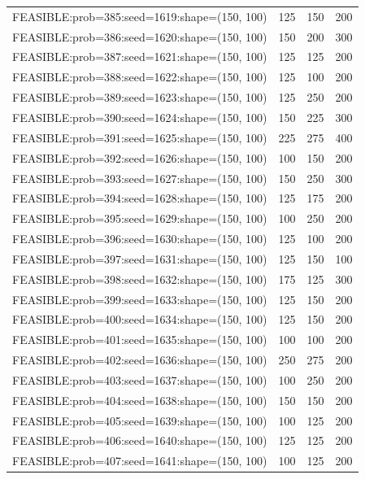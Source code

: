 \begin{longtable}{lccc}
FEASIBLE:prob=385:seed=1619:shape=(150, 100) &      125 &   150 &    200 \\
FEASIBLE:prob=386:seed=1620:shape=(150, 100) &      150 &   200 &    300 \\
FEASIBLE:prob=387:seed=1621:shape=(150, 100) &      125 &   125 &    200 \\
FEASIBLE:prob=388:seed=1622:shape=(150, 100) &      125 &   100 &    200 \\
FEASIBLE:prob=389:seed=1623:shape=(150, 100) &      125 &   250 &    200 \\
FEASIBLE:prob=390:seed=1624:shape=(150, 100) &      150 &   225 &    300 \\
FEASIBLE:prob=391:seed=1625:shape=(150, 100) &      225 &   275 &    400 \\
FEASIBLE:prob=392:seed=1626:shape=(150, 100) &      100 &   150 &    200 \\
FEASIBLE:prob=393:seed=1627:shape=(150, 100) &      150 &   250 &    300 \\
FEASIBLE:prob=394:seed=1628:shape=(150, 100) &      125 &   175 &    200 \\
FEASIBLE:prob=395:seed=1629:shape=(150, 100) &      100 &   250 &    200 \\
FEASIBLE:prob=396:seed=1630:shape=(150, 100) &      125 &   100 &    200 \\
FEASIBLE:prob=397:seed=1631:shape=(150, 100) &      125 &   150 &    100 \\
FEASIBLE:prob=398:seed=1632:shape=(150, 100) &      175 &   125 &    300 \\
FEASIBLE:prob=399:seed=1633:shape=(150, 100) &      125 &   150 &    200 \\
FEASIBLE:prob=400:seed=1634:shape=(150, 100) &      125 &   150 &    200 \\
FEASIBLE:prob=401:seed=1635:shape=(150, 100) &      100 &   100 &    200 \\
FEASIBLE:prob=402:seed=1636:shape=(150, 100) &      250 &   275 &    200 \\
FEASIBLE:prob=403:seed=1637:shape=(150, 100) &      100 &   250 &    200 \\
FEASIBLE:prob=404:seed=1638:shape=(150, 100) &      150 &   150 &    200 \\
FEASIBLE:prob=405:seed=1639:shape=(150, 100) &      100 &   125 &    200 \\
FEASIBLE:prob=406:seed=1640:shape=(150, 100) &      125 &   125 &    200 \\
FEASIBLE:prob=407:seed=1641:shape=(150, 100) &      100 &   125 &    200 \\

\end{longtable}
